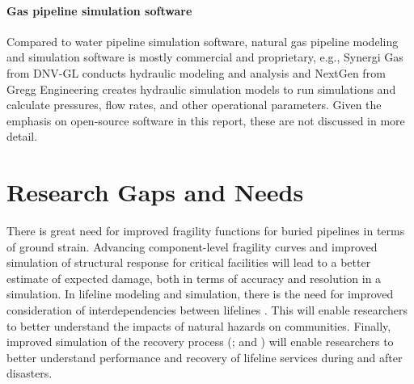 \paragraph{Gas pipeline simulation software} Compared to water pipeline simulation software, natural gas pipeline modeling and simulation software is mostly commercial and proprietary, e.g., Synergi Gas from DNV-GL conducts hydraulic modeling and analysis and NextGen from Gregg Engineering creates hydraulic simulation models to run simulations and calculate pressures, flow rates, and other operational parameters. Given the emphasis on open-source software in this report, these are not discussed in more detail.

\section{Research Gaps and Needs}
\label{sec:perf_pipeline_gaps}

There is great need for improved fragility functions for buried pipelines in terms of ground strain. Advancing component-level fragility curves and improved simulation of structural response for critical facilities will lead to a better estimate of expected damage, both in terms of accuracy and resolution in a simulation. In lifeline modeling and simulation, there is the need for improved consideration of interdependencies between lifelines \citep{duenas-osorio2007seismic, johansen2018probabilistic}. This will enable researchers to better understand the impacts of natural hazards on communities. Finally, improved simulation of the recovery process (\cite{tabucchi2010simulation, he2019disaster}; and \cite{tomar2020hindcasting}) will enable researchers to better understand performance and recovery of lifeline services during and after disasters.


